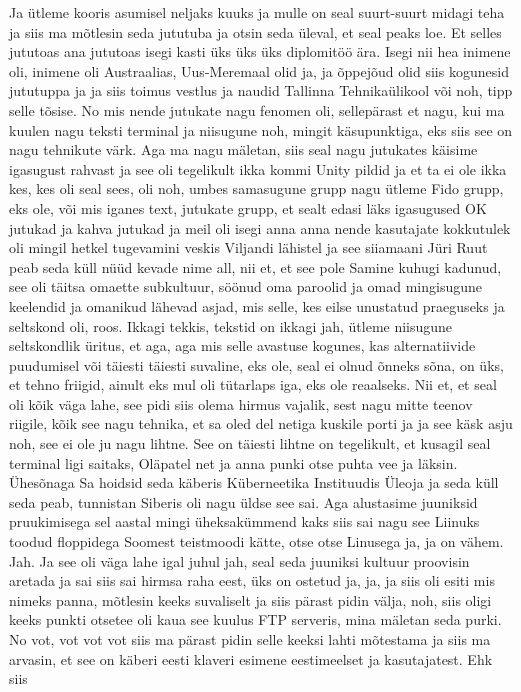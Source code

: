 Ja ütleme kooris asumisel neljaks kuuks ja mulle on seal suurt-suurt midagi teha ja siis ma mõtlesin seda jututuba ja otsin seda üleval, et seal peaks loe. Et selles jututoas ana jututoas isegi kasti üks üks üks diplomitöö ära. Isegi nii hea inimene oli, inimene oli Austraalias, Uus-Meremaal olid ja, ja õppejõud olid siis kogunesid jututuppa ja ja siis toimus vestlus ja naudid Tallinna Tehnikaülikool või noh, tipp selle tõsise. No mis nende jutukate nagu fenomen oli, sellepärast et nagu, kui ma kuulen nagu teksti terminal ja niisugune noh, mingit käsupunktiga, eks siis see on nagu tehnikute värk. Aga ma nagu mäletan, siis seal nagu jutukates käisime igasugust rahvast ja see oli tegelikult ikka kommi Unity pildid ja et ta ei ole ikka kes, kes oli seal sees, oli noh, umbes samasugune grupp nagu ütleme Fido grupp, eks ole, või mis iganes text, jutukate grupp, et sealt edasi läks igasugused OK jutukad ja kahva jutukad ja meil oli isegi anna anna nende kasutajate kokkutulek oli mingil hetkel tugevamini veskis Viljandi lähistel ja see siiamaani Jüri Ruut peab seda küll nüüd kevade nime all, nii et, et see pole Samine kuhugi kadunud, see oli täitsa omaette subkultuur, söönud oma paroolid ja omad mingisugune keelendid ja omanikud lähevad asjad, mis selle, kes eilse unustatud praeguseks ja seltskond oli, roos. Ikkagi tekkis, tekstid on ikkagi jah, ütleme niisugune seltskondlik üritus, et aga, aga mis selle avastuse kogunes, kas alternatiivide puudumisel või täiesti täiesti suvaline, eks ole, seal ei olnud õnneks sõna, on üks, et tehno friigid, ainult eks mul oli tütarlaps iga, eks ole reaalseks. Nii et, et seal oli kõik väga lahe, see pidi siis olema hirmus vajalik, sest nagu mitte teenov riigile, kõik see nagu tehnika, et sa oled del netiga kuskile porti ja ja see käsk asju noh, see ei ole ju nagu lihtne. See on täiesti lihtne on tegelikult, et kusagil seal terminal ligi saitaks, Oläpatel net ja anna punki otse puhta vee ja läksin. Ühesõnaga Sa hoidsid seda käberis Küberneetika Instituudis Üleoja ja seda küll seda peab, tunnistan Siberis oli nagu üldse see sai. Aga alustasime juuniksid pruukimisega sel aastal mingi üheksakümmend kaks siis sai nagu see Liinuks toodud floppidega Soomest teistmoodi kätte, otse otse Linusega ja, ja on vähem. Jah. Ja see oli väga lahe igal juhul jah, seal seda juuniksi kultuur proovisin aretada ja sai siis sai hirmsa raha eest, üks on ostetud ja, ja, ja siis oli esiti mis nimeks panna, mõtlesin keeks suvaliselt ja siis pärast pidin välja, noh, siis oligi keeks punkti otsetee oli kaua see kuulus FTP serveris, mina mäletan seda purki. No vot, vot vot vot siis ma pärast pidin selle keeksi lahti mõtestama ja siis ma arvasin, et see on käberi eesti klaveri esimene eestimeelset ja kasutajatest. Ehk siis
